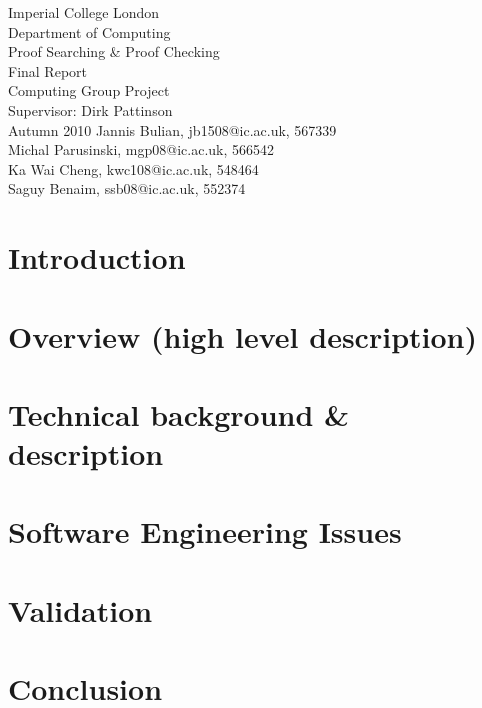 \documentclass[12pt,a4paper]{scrartcl}
\begin{document}
\thispagestyle{empty}
\begin{titlepage}
  \begin{center}
    \vspace*{\fill}
            {{\Large Imperial College London\\ Department of Computing\\}}
            \vfill {{\Huge Proof Searching \& Proof Checking \\
                \vspace{0.2cm}
                     Final Report}}\\
            \vfill {{\large Computing Group Project\\ 
                Supervisor: Dirk Pattinson\\ Autumn 2010}}
            \vfill {Jannis Bulian, jb1508@ic.ac.uk, 567339 \\
                    Michal Parusinski, mgp08@ic.ac.uk, 566542 \\
                    Ka Wai Cheng, kwc108@ic.ac.uk, 548464\\
                    Saguy Benaim, ssb08@ic.ac.uk, 552374}
  \end{center}
\end{titlepage}

\newpage

\tableofcontents
\thispagestyle{empty}

\newpage

\section{Introduction}


\section{Overview (high level description)}


\section{Technical background \& description}



\section{Software Engineering Issues}



\section{Validation}


\section{Conclusion}


\newpage
\singlespacing



\end{document}
